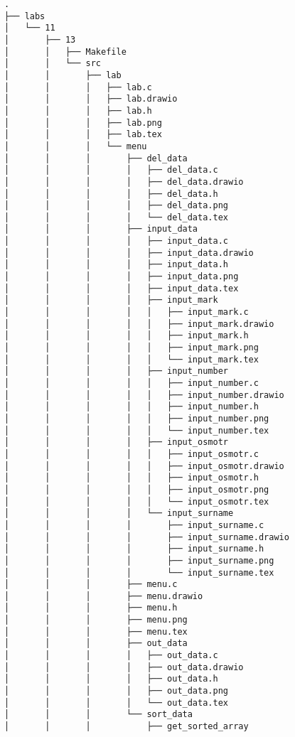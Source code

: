 \begin{verbatim}
.
├── labs
│   └── 11
│       ├── 13
│       │   ├── Makefile
│       │   └── src
│       │       ├── lab
│       │       │   ├── lab.c
│       │       │   ├── lab.drawio
│       │       │   ├── lab.h
│       │       │   ├── lab.png
│       │       │   ├── lab.tex
│       │       │   └── menu
│       │       │       ├── del_data
│       │       │       │   ├── del_data.c
│       │       │       │   ├── del_data.drawio
│       │       │       │   ├── del_data.h
│       │       │       │   ├── del_data.png
│       │       │       │   └── del_data.tex
│       │       │       ├── input_data
│       │       │       │   ├── input_data.c
│       │       │       │   ├── input_data.drawio
│       │       │       │   ├── input_data.h
│       │       │       │   ├── input_data.png
│       │       │       │   ├── input_data.tex
│       │       │       │   ├── input_mark
│       │       │       │   │   ├── input_mark.c
│       │       │       │   │   ├── input_mark.drawio
│       │       │       │   │   ├── input_mark.h
│       │       │       │   │   ├── input_mark.png
│       │       │       │   │   └── input_mark.tex
│       │       │       │   ├── input_number
│       │       │       │   │   ├── input_number.c
│       │       │       │   │   ├── input_number.drawio
│       │       │       │   │   ├── input_number.h
│       │       │       │   │   ├── input_number.png
│       │       │       │   │   └── input_number.tex
│       │       │       │   ├── input_osmotr
│       │       │       │   │   ├── input_osmotr.c
│       │       │       │   │   ├── input_osmotr.drawio
│       │       │       │   │   ├── input_osmotr.h
│       │       │       │   │   ├── input_osmotr.png
│       │       │       │   │   └── input_osmotr.tex
│       │       │       │   └── input_surname
│       │       │       │       ├── input_surname.c
│       │       │       │       ├── input_surname.drawio
│       │       │       │       ├── input_surname.h
│       │       │       │       ├── input_surname.png
│       │       │       │       └── input_surname.tex
│       │       │       ├── menu.c
│       │       │       ├── menu.drawio
│       │       │       ├── menu.h
│       │       │       ├── menu.png
│       │       │       ├── menu.tex
│       │       │       ├── out_data
│       │       │       │   ├── out_data.c
│       │       │       │   ├── out_data.drawio
│       │       │       │   ├── out_data.h
│       │       │       │   ├── out_data.png
│       │       │       │   └── out_data.tex
│       │       │       └── sort_data
│       │       │           ├── get_sorted_array

\end{verbatim}
